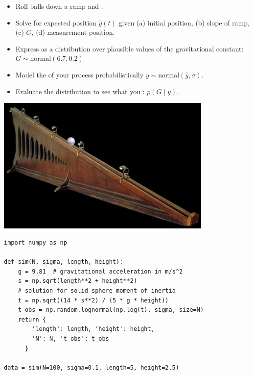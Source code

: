 \documentclass[10pt]{report}
\begin{document}
\begin{itemize}
\item Roll balls down a ramp and .
\item Solve  for expected position $\hat{y}(t)$ given (a) initial position,
  (b) slope of ramp, (c)  $G$, (d)
  measurement position.
\item Express  as a distribution over plausible values
  of the gravitational constant: $G \sim \textrm{normal}(6.7, 0.2)$
\item Model the  of your process
  probabilistically
  $y \sim \textrm{normal}(\hat{y}, \sigma)$.
\item Evaluate the  distribution to see what you
  : $p(G \mid y)$.
\end{itemize}

\begin{center}
\includegraphics[width=0.8\textwidth]{img/galileo-plane.jpeg}
\end{center}

\begin{Verbatim}[fontsize=\small, xleftmargin=3ex]
import numpy as np

def sim(N, sigma, length, height):
    g = 9.81  # gravitational acceleration in m/s^2
    s = np.sqrt(length**2 + height**2)
    # solution for solid sphere moment of inertia
    t = np.sqrt((14 * s**2) / (5 * g * height))
    t_obs = np.random.lognormal(np.log(t), sigma, size=N)
    return {
        'length': length, 'height': height,
        'N': N, 't_obs': t_obs
      }
      
data = sim(N=100, sigma=0.1, length=5, height=2.5)
\end{Verbatim}
\end{document}
